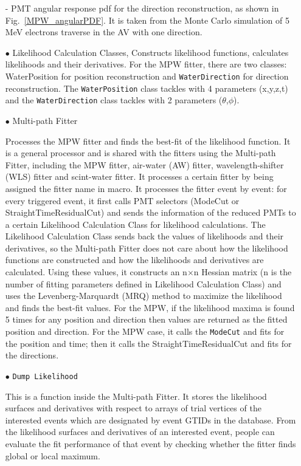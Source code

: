 \begin{itemize}
- PMT angular response pdf for the direction reconstruction, as shown in Fig.~\ref{MPW_angularPDF}. It is taken from the Monte Carlo simulation of 5 MeV electrons traverse in the AV with one direction.


\item[$\bullet$]  Likelihood Calculation Classes, 
Constructs likelihood functions, calculates likelihoods and their derivatives. For the MPW fitter, there are two classes: WaterPosition for position reconstruction and \texttt{WaterDirection} for direction reconstruction. The \texttt{WaterPosition} class tackles with 4 parameters (x,y,z,t) and the \texttt{WaterDirection} class tackles with 2 parameters ($\theta$,$\phi$). 


\item[$\bullet$] Multi-path Fitter

Processes the MPW fitter and finds the best-fit of the likelihood function. It is a general processor and is shared with the fitters using the Multi-path Fitter, including the MPW fitter, air-water (AW) fitter, wavelength-shifter (WLS) fitter and scint-water fitter. It processes a certain fitter by being assigned the fitter name in macro. It processes the fitter event by event: for every triggered event, it first calls PMT selectors (ModeCut or StraightTimeResidualCut) and sends the information of the reduced PMTs to a certain Likelihood Calculation Class for likelihood calculations. The Likelihood Calculation Class sends back the values of likelihoods and their derivatives, so the Multi-path Fitter does not care about how the likelihood functions are constructed and how the likelihoods and derivatives are calculated. Using these values, it constructs an n$\times$n Hessian matrix (n is the number of fitting parameters defined in Likelihood Calculation Class) and uses the Levenberg-Marquardt (MRQ) method to maximize the likelihood and finds the best-fit values. For the MPW, if the likelihood maxima is found 5 times for any position and direction then values are returned as the fitted position and direction. For the MPW case, it calls the \texttt{ModeCut} and fits for the position and time; then it calls the StraightTimeResidualCut and fits for the directions.

\item[$\bullet$] \texttt{Dump Likelihood}

This is a function inside the Multi-path Fitter. It stores the likelihood surfaces and derivatives with respect to arrays of trial vertices of the interested events which are designated by event GTIDs in the database. From the likelihood surfaces and derivatives of an interested event, people can evaluate the fit performance of that event by checking whether the fitter finds global or local maximum. 


\end{itemize}
